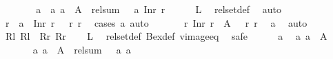 \begin{isabellebody}
\ \ \ \ \isamarkupfalse%
\ \isamarkupfalse%
\ a{}\ \ a{}{\isacharcolon}\ {\isachardoublequoteopen}a{}\ {\isasymin}\ A{}{\isachardoublequoteclose}\ \ {\isachardoublequoteopen}rel{\isacharunderscore}sum\ {\isasymchi}\ {\isasymphi}\ a{}\ {\isacharparenleft}Inr\ r{}{\isacharparenright}{\isachardoublequoteclose}\isanewline
\ \ \ \ \isamarkupfalse%
\ L\ \isamarkupfalse%
\ rel{\isacharunderscore}set{\isacharunderscore}def\ \isamarkupfalse%
\ auto\isanewline
\ \ \ \ \isamarkupfalse%
\ \isamarkupfalse%
\ r{}\ \ {\isachardoublequoteopen}a{}\ {\isacharequal}\ Inr\ r{}\ {\isasymand}\ {\isasymphi}\ r{}\ r{}{\isachardoublequoteclose}\ \isamarkupfalse%
\ {\isacharparenleft}cases\ a{}{\isacharcomma}\ auto{\isacharparenright}\isanewline
\ \ \ \ \isamarkupfalse%
\ {\isachardoublequoteopen}{\isasymexists}\ r{}{\isachardot}\ Inr\ r{}\ {\isasymin}\ A{}\ {\isasymand}\ {\isasymphi}\ r{}\ r{}{\isachardoublequoteclose}\ \isamarkupfalse%
\ a{}\ \isamarkupfalse%
\ auto\isanewline
\ \ \isamarkupfalse%
\isanewline
{}\isamarkupfalse%
\isanewline
\ \ \isamarkupfalse%
\ Rl{\isacharcolon}\ {\isachardoublequoteopen}{\isacharquery}Rl{\isachardoublequoteclose}\ \ Rr{\isacharcolon}\ {\isachardoublequoteopen}{\isacharquery}Rr{\isachardoublequoteclose}\isanewline
\ \ \isamarkupfalse%
\ {\isacharquery}L\ \isamarkupfalse%
\ rel{\isacharunderscore}set{\isacharunderscore}def\ Bex{\isacharunderscore}def\ vimage{\isacharunderscore}eq\ \isamarkupfalse%
\ safe\isanewline
\ \ \ \ \isamarkupfalse%
\ a{}\ \isamarkupfalse%
\ a{}{\isacharcolon}\ {\isachardoublequoteopen}a{}\ {\isasymin}\ A{}{\isachardoublequoteclose}\isanewline
\ \ \ \ \isamarkupfalse%
\ {\isachardoublequoteopen}{\isasymexists}\ a{}{\isachardot}\ a{}\ {\isasymin}\ A{}\ {\isasymand}\ rel{\isacharunderscore}sum\ {\isasymchi}\ {\isasymphi}\ a{}\ a{}{\isachardoublequoteclose}\isanewline
\ \ \ \ \isamarkupfalse%

\end{isabellebody}

